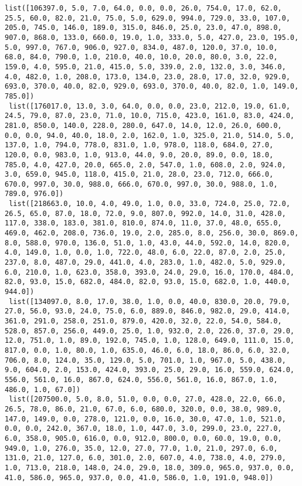 \documentclass[11pt]{article}
\begin{document}
\begin{Verbatim}[commandchars=\\\{\}]
 list([106397.0, 5.0, 7.0, 64.0, 0.0, 0.0, 26.0, 754.0, 17.0, 62.0, 25.5, 60.0, 82.0, 21.0, 75.0, 5.0, 629.0, 994.0, 729.0, 33.0, 107.0, 205.0, 745.0, 146.0, 189.0, 315.0, 846.0, 25.0, 23.0, 47.0, 898.0, 907.0, 868.0, 133.0, 660.0, 19.0, 1.0, 333.0, 5.0, 427.0, 23.0, 195.0, 5.0, 997.0, 767.0, 906.0, 927.0, 834.0, 487.0, 120.0, 37.0, 10.0, 68.0, 84.0, 790.0, 1.0, 210.0, 40.0, 10.0, 20.0, 80.0, 3.0, 22.0, 159.0, 4.0, 595.0, 21.0, 415.0, 5.0, 339.0, 2.0, 132.0, 3.0, 346.0, 4.0, 482.0, 1.0, 208.0, 173.0, 134.0, 23.0, 28.0, 17.0, 32.0, 929.0, 693.0, 370.0, 40.0, 82.0, 929.0, 693.0, 370.0, 40.0, 82.0, 1.0, 149.0, 785.0])
 list([176017.0, 13.0, 3.0, 64.0, 0.0, 0.0, 23.0, 212.0, 19.0, 61.0, 24.5, 79.0, 87.0, 23.0, 71.0, 10.0, 715.0, 423.0, 161.0, 83.0, 424.0, 281.0, 850.0, 140.0, 228.0, 280.0, 647.0, 14.0, 12.0, 26.0, 600.0, 0.0, 0.0, 94.0, 40.0, 18.0, 2.0, 162.0, 1.0, 325.0, 21.0, 514.0, 5.0, 137.0, 1.0, 794.0, 778.0, 831.0, 1.0, 978.0, 118.0, 684.0, 27.0, 120.0, 0.0, 983.0, 1.0, 913.0, 44.0, 9.0, 20.0, 89.0, 0.0, 18.0, 785.0, 4.0, 427.0, 20.0, 665.0, 2.0, 547.0, 1.0, 608.0, 2.0, 924.0, 3.0, 659.0, 945.0, 118.0, 415.0, 21.0, 28.0, 23.0, 712.0, 666.0, 670.0, 997.0, 30.0, 988.0, 666.0, 670.0, 997.0, 30.0, 988.0, 1.0, 789.0, 976.0])
 list([218663.0, 10.0, 4.0, 49.0, 1.0, 0.0, 33.0, 724.0, 25.0, 72.0, 26.5, 65.0, 87.0, 18.0, 72.0, 9.0, 807.0, 992.0, 14.0, 31.0, 428.0, 117.0, 338.0, 183.0, 381.0, 810.0, 874.0, 11.0, 37.0, 48.0, 655.0, 469.0, 462.0, 208.0, 736.0, 19.0, 2.0, 285.0, 8.0, 256.0, 30.0, 869.0, 8.0, 588.0, 970.0, 136.0, 51.0, 1.0, 43.0, 44.0, 592.0, 14.0, 820.0, 4.0, 149.0, 1.0, 0.0, 1.0, 722.0, 48.0, 6.0, 22.0, 87.0, 2.0, 25.0, 237.0, 8.0, 487.0, 29.0, 441.0, 4.0, 283.0, 1.0, 482.0, 5.0, 929.0, 6.0, 210.0, 1.0, 623.0, 358.0, 393.0, 24.0, 29.0, 16.0, 170.0, 484.0, 82.0, 93.0, 15.0, 682.0, 484.0, 82.0, 93.0, 15.0, 682.0, 1.0, 440.0, 944.0])
 list([134097.0, 8.0, 17.0, 38.0, 1.0, 0.0, 40.0, 830.0, 20.0, 79.0, 27.0, 56.0, 93.0, 24.0, 75.0, 6.0, 889.0, 846.0, 982.0, 29.0, 414.0, 361.0, 291.0, 258.0, 251.0, 879.0, 420.0, 32.0, 22.0, 54.0, 584.0, 528.0, 857.0, 256.0, 449.0, 25.0, 1.0, 932.0, 2.0, 226.0, 37.0, 29.0, 12.0, 751.0, 1.0, 89.0, 192.0, 745.0, 1.0, 128.0, 649.0, 111.0, 15.0, 817.0, 0.0, 1.0, 80.0, 1.0, 635.0, 46.0, 6.0, 18.0, 86.0, 6.0, 32.0, 706.0, 8.0, 124.0, 35.0, 129.0, 5.0, 701.0, 1.0, 967.0, 5.0, 438.0, 9.0, 604.0, 2.0, 153.0, 424.0, 393.0, 25.0, 29.0, 16.0, 559.0, 624.0, 556.0, 561.0, 16.0, 867.0, 624.0, 556.0, 561.0, 16.0, 867.0, 1.0, 486.0, 1.0, 67.0])
 list([207500.0, 5.0, 8.0, 51.0, 0.0, 0.0, 27.0, 428.0, 22.0, 66.0, 26.5, 78.0, 86.0, 21.0, 67.0, 6.0, 680.0, 320.0, 0.0, 38.0, 989.0, 147.0, 149.0, 0.0, 278.0, 121.0, 0.0, 16.0, 30.0, 47.0, 1.0, 521.0, 0.0, 0.0, 242.0, 367.0, 18.0, 1.0, 447.0, 3.0, 299.0, 23.0, 227.0, 6.0, 358.0, 905.0, 616.0, 0.0, 912.0, 800.0, 0.0, 60.0, 19.0, 0.0, 949.0, 1.0, 276.0, 35.0, 12.0, 27.0, 77.0, 1.0, 21.0, 297.0, 6.0, 131.0, 21.0, 127.0, 6.0, 301.0, 2.0, 607.0, 4.0, 738.0, 4.0, 279.0, 1.0, 713.0, 218.0, 148.0, 24.0, 29.0, 18.0, 309.0, 965.0, 937.0, 0.0, 41.0, 586.0, 965.0, 937.0, 0.0, 41.0, 586.0, 1.0, 191.0, 948.0])

\end{Verbatim}
\end{document}

